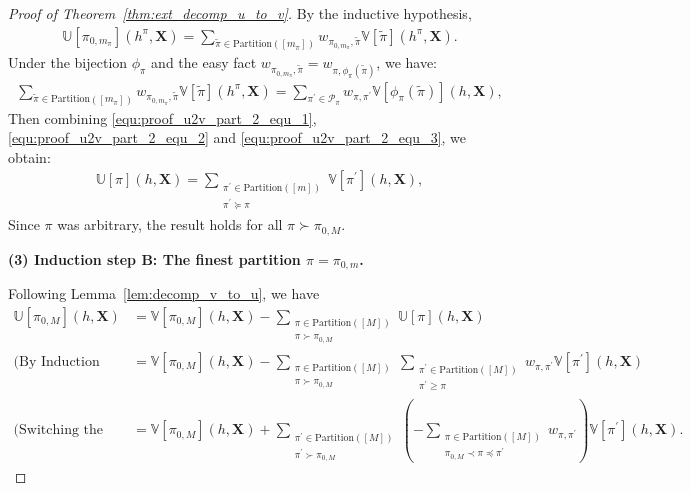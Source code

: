 \documentclass[letterpaper,11pt]{article}
\newcommand{\Zhang}[1]{{\color{blue}{Zhang: #1}}}
\newcommand{\Chen}[1]{{\color{orange}{Chen: #1}}}
\newcommand{\ustat}{\mathbb{U}}
\newcommand{\vstat}{\mathbb{V}}
\newcommand{\partition}{\mathrm{Partition}}
\newcommand{\partitionp}[1]{\partition(#1)}
\newcommand{\pleq}{\preceq}
\newcommand{\pgeq}{\succeq}
\newcommand{\pless}{\prec}
\newcommand{\pgreater}{\succ}
\begin{document}
\begin{proof}[Proof of Theorem~\ref{thm:ext_decomp_u_to_v}]
By the inductive hypothesis,
\begin{align}
\label{equ:proof_u2v_part_2_equ_2}
    \ustat[\pi_{0, m_\pi}](h^\pi, \bm{X}) 
    = \sum_{\tilde{\pi} \in \partitionp{[m_\pi]}} 
    w_{\pi_{0, m_\pi}, \tilde{\pi}} \vstat[\tilde{\pi}](h^\pi, \bm{X}).
\end{align}
Under the bijection $\phi_{\pi}$ and the easy fact $w_{\pi_{0, m_\pi},\tilde{\pi}} = w_{\pi, \phi_{\pi}(\tilde{\pi})}$, we have:
\begin{align}
\label{equ:proof_u2v_part_2_equ_3}
    \sum_{\tilde{\pi} \in \partitionp{[m_\pi]}} w_{\pi_{0, m_\pi},\tilde{\pi}} \vstat[\tilde{\pi}](h^\pi, \bm{X}) = \sum_{\pi^{\prime} \in \mathcal{P}_\pi}  w_{\pi, \pi^{\prime}} \vstat[\phi_{\pi}(\tilde{\pi})](h, \bm{X}),
\end{align}
Then combining \eqref{equ:proof_u2v_part_2_equ_1}, \eqref{equ:proof_u2v_part_2_equ_2} and \eqref{equ:proof_u2v_part_2_equ_3}, we obtain:
\begin{align*}
     \ustat[\pi](h, \bm{X}) 
    = \sum_{\substack{ \pi^{\prime} \in \partitionp{[m]} \\ \pi^{\prime} \pgeq \pi }}   \vstat[\pi^{\prime}](h, \bm{X}),
\end{align*}
Since $\pi$ was arbitrary, the result holds for all $\pi \pgreater \pi_{0,M}$.

\textbf{(3) Induction step B: The finest partition $\pi = \pi_{0,m}$.}  

Following Lemma~\ref{lem:decomp_v_to_u}, we have
\begin{align*}
    \ustat[\pi_{0,M}](h,\bm{X}) 
    &= \vstat[\pi_{0,M}]( h, \bm{X}) 
    - \sum_{\substack{ \pi \in \partitionp{[M]} \\ \pi \pgreater \pi_{0,M}}} \ustat[\pi](h, \bm{X}) \\
    \text{(By Induction Step A)}\quad 
    &= \vstat[\pi_{0,M}]( h, \bm{X}) 
    - \sum_{\substack{ \pi \in \partitionp{[M]} \\ \pi \pgreater \pi_{0,M}}} \sum_{\substack{ \pi^{\prime} \in \partitionp{[M]} \\ \pi^{\prime} \geq \pi}}  
    w_{\pi, \pi^{\prime}}  \vstat[\pi^{\prime}](h, \bm{X}) \\
    \text{(Switching the order of summation)}\quad 
    &= \vstat[\pi_{0,M}]( h, \bm{X}) 
    + \sum_{\substack{ \pi^{\prime} \in \partitionp{[M]} \\ \pi^{\prime} \pgreater \pi_{0,M}}} \left(  - \sum_{\substack{ \pi \in \partitionp{[M]} \\  \pi_{0,M} \pless \pi \pleq \pi^{\prime} }}   w_{\pi, \pi^{\prime}} \right) \vstat[\pi^{\prime}](h, \bm{X}).
\end{align*}


\end{proof}
\end{document}
